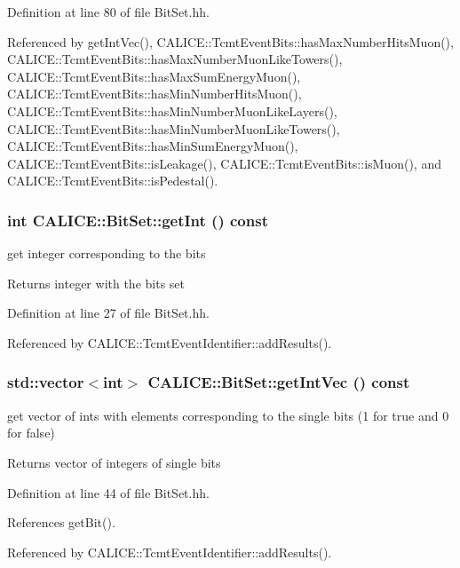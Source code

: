 Definition at line 80 of file BitSet.hh.

Referenced by getIntVec(), CALICE::TcmtEventBits::hasMaxNumberHitsMuon(), CALICE::TcmtEventBits::hasMaxNumberMuonLikeTowers(), CALICE::TcmtEventBits::hasMaxSumEnergyMuon(), CALICE::TcmtEventBits::hasMinNumberHitsMuon(), CALICE::TcmtEventBits::hasMinNumberMuonLikeLayers(), CALICE::TcmtEventBits::hasMinNumberMuonLikeTowers(), CALICE::TcmtEventBits::hasMinSumEnergyMuon(), CALICE::TcmtEventBits::isLeakage(), CALICE::TcmtEventBits::isMuon(), and CALICE::TcmtEventBits::isPedestal().
\subsubsection[{getInt}]{\setlength{\rightskip}{0pt plus 5cm}int CALICE::BitSet::getInt () const\hspace{0.3cm}{\ttfamily  [inline]}}\label{classCALICE_1_1BitSet_a148efced5e1ce099391216e2f4c9718a}


get integer corresponding to the bits \begin{DoxyReturn}{Returns}
integer with the bits set 
\end{DoxyReturn}


Definition at line 27 of file BitSet.hh.

Referenced by CALICE::TcmtEventIdentifier::addResults().
\subsubsection[{getIntVec}]{\setlength{\rightskip}{0pt plus 5cm}std::vector$<$int$>$ CALICE::BitSet::getIntVec () const\hspace{0.3cm}{\ttfamily  [inline]}}\label{classCALICE_1_1BitSet_a807161095aee85a74b6f520f32690ace}


get vector of ints with elements corresponding to the single bits (1 for true and 0 for false) \begin{DoxyReturn}{Returns}
vector of integers of single bits 
\end{DoxyReturn}


Definition at line 44 of file BitSet.hh.

References getBit().

Referenced by CALICE::TcmtEventIdentifier::addResults().
